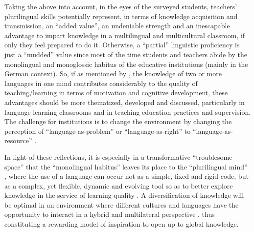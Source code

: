 \documentclass[output=paper]{../langscibook}
\begin{document}
Taking the above into account, in the eyes of the surveyed students, teachers’ plurilingual skills potentially represent, in terms of knowledge acquisition and transmission, an “added value”, an undeniable strength and an inescapable advantage to impart knowledge in a multilingual and multicultural classroom, if only they feel prepared to do it. Otherwise, a “partial” linguistic proficiency is just a “mudded” value since most of the time students and teachers abide by the monolingual and monoglossic habitus of the educative institutions (mainly in the German context). So, if as mentioned by \citet{Cook1991,Cook2008}, the knowledge of two or more languages in one mind contributes considerably to the quality of teaching\slash learning in terms of motivation and cognitive development, these advantages should be more thematized, developed and discussed, particularly in language learning classrooms and in teaching education practices and supervision. The challenge for institutions is to change the environment by changing the perception of “language-as-problem” or “language-as-right” to “language-as-resource” \citep{Ruiz1984}.

In light of these reflections, it is especially in a transformative \citep{SavinBaden2008}  “troublesome space” \citep{Montgomery2011} that the “monolingual habitus” \citep{Gogolin2008} leaves its place to the “plurilingual mind” \citep{Menghini2017}, where the use of a language can occur not as a simple, fixed and rigid code, but as a complex, yet flexible, dynamic and evolving tool so as to better explore knowledge in the service of learning quality \citep{Berthoud2016}. A diversification of knowledge will be optimal in an environment where different cultures and languages have the opportunity to interact in a hybrid and multilateral perspective \citep{Yanaprasart2018}, thus constituting a rewarding model of inspiration to open up to global knowledge.

{\sloppy\printbibliography[heading=subbibliography,notkeyword=this]}
\end{document}
